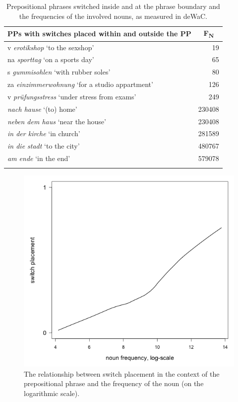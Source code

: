 \begin{table}
\begin{tabular}{lr}
		\lsptoprule
		PPs with switches placed within and outside the PP & \multicolumn{1}{c}{F\textsubscript{N}}\\\midrule
			v \textit{erotikshop} `to the sexshop' & 19\\
			na \textit{sporttag} `on a sports day' & 65\\
			s \textit{gummisohlen} `with rubber soles' & 80\\
			za \textit{einzimmerwohnung} `for a studio appartment' & 126\\
			v \textit{prüfungsstress} `under stress from exams' & 249\\
			\midrule
			\textit{nach hause} `(to) home' & 230408\\
			\textit{neben dem haus} `near the house' & 230408\\
			\textit{in der kirche} `in church' & 281589\\
			\textit{in die stadt} `to the city' & 480767\\
			\textit{am ende} `in the end' & 579078\\
		\lspbottomrule
	\end{tabular}
	\caption{Prepositional phrases switched inside and at the phrase boundary and the frequencies of the involved nouns, as measured in deWaC.\label{tab:5:4}}
\end{table}

\begin{figure}
    	\includegraphics[scale=0.5]{figures/5-Figure_3.png}	
		\caption{The relationship between switch placement in the context of the prepositional phrase and the frequency of the noun (on the logarithmic scale).}
	\label{fig:5:3}
\end{figure}

